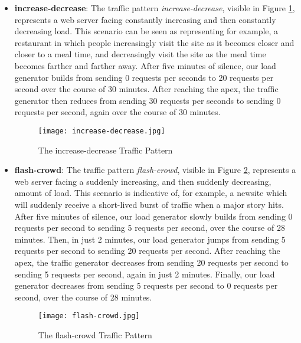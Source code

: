 \begin{itemize}
  \item \textbf{increase-decrease}: The traffic pattern
    \textit{increase-decrease}, visible in Figure \ref{fig:increase-decrease},
    represents a web server facing constantly increasing and then constantly
    decreasing load. This scenario can be seen as representing for example, a
    restaurant in which people increasingly visit the site as it becomes closer
    and closer to a meal time, and decreasingly visit the site as the meal time
    becomes farther and farther away. After five minutes of silence, our load
    generator builds from sending 0 requests per seconds to 20 requests per
    second over the course of 30 minutes. After reaching the apex, the traffic
    generator then reduces from sending 30 requests per seconds to sending 0
    requests per second, again over the course of 30 minutes.

    \begin{figure}[!h]
      \centerline{\texttt{[image: increase-decrease.jpg]}}
      \caption{The increase-decrease Traffic Pattern}
      \label{fig:increase-decrease}
    \end{figure}

  \item \textbf{flash-crowd}: The traffic pattern \textit{flash-crowd}, visible
    in Figure \ref{fig:flash-crowd}, represents a web server facing a suddenly
    increasing, and then suddenly decreasing, amount of load. This scenario is
    indicative of, for example, a newsite which will suddenly receive a
    short-lived burst of traffic when a major story hits. After five minutes of
    silence, our load generator slowly builds from sending 0 requests per second
    to sending 5 requests per second, over the course of 28 minutes. Then, in
    just 2 minutes, our load generator jumps from sending 5 requests per second
    to sending 20 requests per second. After reaching the apex, the traffic
    generator decreases from sending 20 requests per second to sending 5
    requests per second, again in just 2 minutes. Finally, our load generator
    decreases from sending 5 requests per second to 0 requests per second, over
    the course of 28 minutes.

    \begin{figure}[!h]
      \centerline{\texttt{[image: flash-crowd.jpg]}}
      \caption{The flash-crowd Traffic Pattern}
      \label{fig:flash-crowd}
    \end{figure}

\end{itemize}
